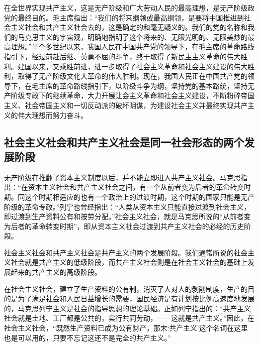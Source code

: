 \documentclass{book}
\begin{document}
在全世界实现共产主义，这是无产阶级和广大劳动人民的最高理想，是无产阶级政党的最终目的。毛主席指出：“我们的将来纲领或最高纲领，是要将中国推进到社会主义社会和共产主义社会去的，这是确定的和毫无疑义的。我们的党的名称和我们的马克思主义的宇宙观，明确地指明了这个将来的、无限光明的、无限美炒的最高理想。”半个多世纪以来，我国人民在中国共产党的领导下，在毛主席的革命路线指引下，经过前赴后继、英勇不屈的斗争，终于取得了新民主主义革命的伟大胜利。建国以来，又乘胜前进，进一步取得了社会主义革命和社会主义建设的伟大胜利，取得了无产阶级文化大革命的伟大胜利。现在，我国人民正在中国共产党的领导下，在毛主席的革命路线指引下，以阶级斗争为纲，坚持党的基本路统，坚持无产阶级专政下的继续革命，大力开展让会主义革命和社会主义建设，不断粉碎帝国主义、社会帝国主义和一切反动派的破坏阴谋，为建设社会主义并最终实现共产主义的伟大理想而努力奋斗。

\subsection{社会主义社会和共产主义社会是同一社会形态的两个发展阶段}

无产阶级在推翻了资本主义制度以后，并不能立即进入共产主义社会。马克思指出：“在资本主义社会和共产主义社会之间，有一个从前者变为后者的革命转变时期。同这个时期相适应的也有一个政治上的过渡时期，这个时期的国家只能是无产阶级的革命专政。”列宁也曾经指出：“人类从资本主义只能直接过渡到社会主义，即过渡到生产资料公有和按劳分配。”社会主义社会，就是马克思所说的“从前者变为后者的革命转变时期”，即从资本主义社会过渡到共产主义社会的必经的历史阶段。

社会主义社会和共产主义社会是共产主义的两个发展阶段。我们通常所说的社会主义社会就是共产主义的低级阶段，而共产主义社会则是在社会主义社会的基础上发展起来的共产主义的高级阶段。

在社会主义社会，建立了生产资料的公有制，消灭了人对人的剥削制度，生产的目的是为了满足社会和人民日益增长的需要，国民经济是有计划按比例高速度地发展的，马克思列宁主义是社会的指导思想的理论基础。正如列宁指出的：“共产主义社会就是土地、工厂都是公共的，实行共同劳动，——这就是共产主义。”因此，在社会主义社会，“既然生产资料已成为公有豺产，那末‘共产主义’这个名词在这里也是可以用的，只要不忘记这还不是完全的共产主义。”
\end{document}
